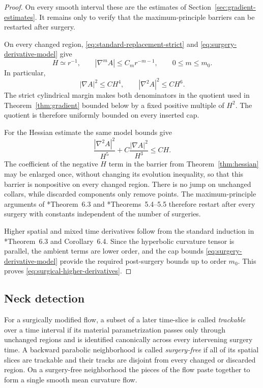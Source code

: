 \documentclass[11pt,reqno]{amsart}
\theoremstyle{definition}
\theoremstyle{remark}
\numberwithin{equation}{section}
\begin{document}
\begin{proof}
  On every smooth interval these are the estimates of
  Section~\ref{sec:gradient-estimates}.  It remains only to verify that the
  maximum-principle barriers can be restarted after surgery.

  On every changed region,
  \eqref{eq:standard-replacement-strict} and
  \eqref{eq:surgery-derivative-model} give
  \begin{equation*}
  H\simeq r^{-1},
  \qquad
  |\nabla^mA|
  \leq
  C_mr^{-m-1},
  \qquad
  0\leq m\leq m_0.
  \end{equation*}
  In particular,
  \begin{equation*}
  |\nabla A|^2\leq CH^4,
  \qquad
  |\nabla^2A|^2\leq CH^6.
  \end{equation*}
  The strict cylindrical margin makes both denominators in the quotient used
  in Theorem~\ref{thm:gradient} bounded below by a fixed positive multiple of
  $H^2$.  The quotient is therefore uniformly bounded on every inserted cap.

  For the Hessian estimate the same model bounds give
  \begin{equation*}
  \frac{|\nabla^2A|^2}{H^5}
  +C\frac{|\nabla A|^2}{H^3}
  \leq CH.
  \end{equation*}
  The coefficient of the negative $H$ term in the barrier from
  Theorem~\ref{thm:hessian} may be enlarged once, without changing its
  evolution inequality, so that this barrier is nonpositive on every changed
  region.  There is no jump on unchanged collars, while discarded components
  only remove points.  The maximum-principle arguments of
  \cite{HS09}*{Theorem~6.3} and \cite{LN21}*{Theorems~5.4--5.5} therefore
  restart after every surgery with constants independent of the number of
  surgeries.

  Higher spatial and mixed time derivatives follow from the standard
  induction in \cite{HS09}*{Theorem~6.3 and Corollary~6.4}.  Since the
  hyperbolic
  curvature tensor is parallel, the ambient terms are lower order, and the
  cap bounds \eqref{eq:surgery-derivative-model} provide the required
  post-surgery bounds up to order $m_0$.  This proves
  \eqref{eq:surgical-higher-derivatives}.
\end{proof}


\subsection{Neck detection}

For a surgically modified flow, a subset of a later time-slice is called
\emph{trackable} over a time interval if its material parametrization
passes only through unchanged regions and is identified canonically across
every intervening surgery time.  A backward parabolic neighborhood is
called \emph{surgery-free} if all of its spatial slices are trackable and
their tracks are disjoint from every changed or discarded region.  On a
surgery-free neighborhood the pieces of the flow paste together to form a
single smooth mean curvature flow.
\end{document}
